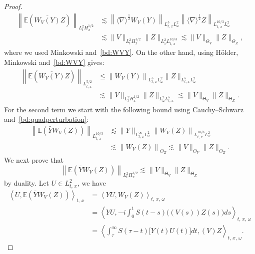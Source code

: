 \documentclass[AHL, Unicode, longabstracts,published]{cedram}
\newcommand{\E}{\mathbb{E}}
\begin{document}
\begin{proof}
\begin{equation}\label{bd:Q1inter1}
\begin{split}
\left\| \E \left(\overline{W_V(Y)} Z\right) \right\|_{L^2_{t}H^{1/2}_x} &\lesssim \left\| \langle \nabla \rangle^{\frac 12} W_V(Y) \right\|_{L^5_{t,\,x} L^2_\omega}\left\| \langle \nabla \rangle^{\frac 12} Z \right\|_{L^{10/3}_{t,\,x} L^2_\omega}\\
&\lesssim \|V\|_{L^2_tH^{1/2}_x} \| Z \|_{ L^2_\omega L^{10/3}_{t,\,x}}\lesssim \| V \|_{\Theta_V}\| Z\|_{\Theta_Z},
\end{split}
\end{equation}
where we used Minkowski and~\eqref{bd:WVY}. On the other hand, using H\"older, Minkowski and~\eqref{bd:WVY} gives:
\begin{equation} \label{bd:Q1inter2}
\begin{split}
\left\| \E \left(\overline{W_V(Y)} Z\right) \right\|_{L^{5/2}_{t,\,x}} &\leq \left\|W_V(Y)\right\|_{L^5_{t,\,x} L^2_\omega} \|Z\|_{L^{5}_{t,\,x} L^2_\omega}\\
&\lesssim \| V \|_{L^2_tH^{1/2}_x}\| Z \|_{L^2_\omega L^{5}_{t,\,x}} \lesssim \| V \|_{\Theta_V}\| Z \|_{\Theta_Z}.
\end{split}
\end{equation}
For the second term we start with the following bound using Cauchy--Schwarz and~\eqref{bd:quadperturbation}:
\begin{equation} \label{bd:L103inter}
\begin{split}
\left\| \E\left(\bar Y W_V(Z)\right)\right\|_{L^{10/3}_{t,\,x}} &\lesssim \|Y\|_{L^\infty_{t,\,x} L^2_\omega} \left\|W_V(Z)\right\|_{L^{10/3}_{t,\,x} L^2_\omega}\\
&\lesssim \left\| W_V(Z)\right\|_{\Theta_{Z}}\lesssim \| V\|_{\Theta_{V}}\| Z\|_{\Theta_{Z}}.
\end{split}
\end{equation}
We next prove that
\begin{equation} \label{bd:L2dualityinter}
\left\| \E\left(\bar Y W_V(Z)\right)\right\|_{L^2_t H^{1/2}_{x}} \lesssim \|V\|_{\Theta_V} \|Z\|_{\Theta_Z}
\end{equation}
by duality. Let $U \in L^2_{t,\,x}$, we have
\begin{align*}
\left\langle U, \E \left(\bar Y W_V(Z)\right)\right\rangle_{t,\,x} 
&=\left\langle YU,W_V(Z)\right\rangle_{t,\,x,\,\omega}\\
&=\left\langle YU,-i\int_0^t S(t-s)\big((V(s))Z(s)\big)ds\right\rangle_{t,\,x,\,\omega}\\
&= \left\langle\int_{\tau}^\infty S(\tau - t)\big[Y(t)U(t)\big]dt,(V) Z\right\rangle_{t,\,x,\,\omega}.
\end{align*}


\end{proof}
\end{document}
